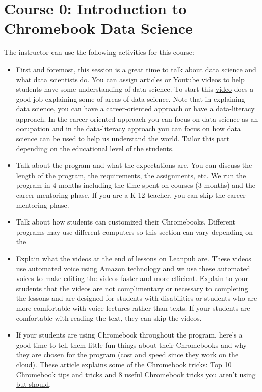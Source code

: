 \documentclass[]{book}
\begin{document}
\hypertarget{intro}{%
\chapter*{Course 0: Introduction to Chromebook Data Science}\label{intro}}

The instructor can use the following activities for this course:

\begin{itemize}
\item
  First and foremost, this session is a great time to talk about data science and what data scientists do. You can assign articles or Youtube videos to help students have some understanding of data science. To start this \href{https://www.youtube.com/watch?v=X3paOmcrTjQ}{video} does a good job explaining some of areas of data science. Note that in explaining data science, you can have a career-oriented approach or have a data-literacy approach. In the career-oriented approach you can focus on data science as an occupation and in the data-literacy approach you can focus on how data science can be used to help us understand the world. Tailor this part depending on the educational level of the students.
\item
  Talk about the program and what the expectations are. You can discuss the length of the program, the requirements, the assignments, etc. We run the program in 4 months including the time spent on courses (3 months) and the career mentoring phase. If you are a K-12 teacher, you can skip the career mentoring phase.
\item
  Talk about how students can customized their Chromebooks. Different programs may use different computers so this section can vary depending on the
\item
  Explain what the videos at the end of lessons on Leanpub are. These videos use automated voice using Amazon technology and we use these automated voices to make editing the videos faster and more efficient. Explain to your students that the videos are not complimentary or necessary to completing the lessons and are designed for students with disabilities or students who are more comfortable with voice lectures rather than texts. If your students are comfortable with reading the text, they can skip the videos.
\item
  If your students are using Chromebook throughout the program, here's a good time to tell them little fun things about their Chromebooks and why they are chosen for the program (cost and speed since they work on the cloud). These article explains some of the Chromebook tricks: \href{https://www.androidcentral.com/top-10-chromebook-tips-and-tricks}{Top 10 Chromebook tips and tricks} and \href{https://www.komando.com/tips/447946/7-useful-chromebook-tricks-you-arent-using-but-should}{8 useful Chromebook tricks you aren't using but should}.

\end{itemize}
\end{document}

